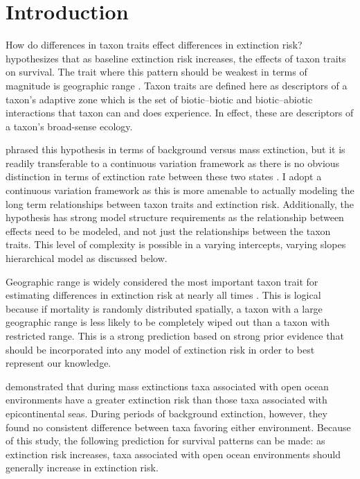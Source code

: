 \documentclass[12pt,letterpaper]{article}
\begin{document}
\section{Introduction}

How do differences in taxon traits effect differences in extinction risk? \citet{Jablonski1986} hypothesizes that as baseline extinction risk increases, the effects of taxon traits on survival. The trait where this pattern should be weakest in terms of magnitude is geographic range \citep{Jablonski1986}. Taxon traits are defined here as descriptors of a taxon's adaptive zone which is the set of biotic--biotic and biotic--abiotic interactions that taxon can and does experience. In effect, these are descriptors of a taxon's broad-sense ecology.

\citet{Jablonski1986} phrased this hypothesis in terms of background versus mass extinction, but it is readily transferable to a continuous variation framework as there is no obvious distinction in terms of extinction rate between these two states \citep{Wang2003}. I adopt a continuous variation framework as this is more amenable to actually modeling the long term relationships between taxon traits and extinction risk. Additionally, the \citet{Jablonski1986} hypothesis has strong model structure requirements as the relationship between effects need to be modeled, and not just the relationships between the taxon traits. This level of complexity is possible in a varying intercepts, varying slopes hierarchical model as discussed below.

Geographic range is widely considered the most important taxon trait for estimating differences in extinction risk at nearly all times \citep{Jablonski1986,Jablonski1987,Jablonski2003,Payne2007}. This is logical because if mortality is randomly distributed spatially, a taxon with a large geographic range is less likely to be completely wiped out than a taxon with restricted range. This is a strong prediction based on strong prior evidence that should be incorporated into any model of extinction risk in order to best represent our knowledge.

\citet{Miller2009a} demonstrated that during mass extinctions taxa associated with open ocean environments have a greater extinction risk than those taxa associated with epicontinental seas. During periods of background extinction, however, they found no consistent difference between taxa favoring either environment. Because of this study, the following prediction for survival patterns can be made: as extinction risk increases, taxa associated with open ocean environments should generally increase in extinction risk.
\end{document}
